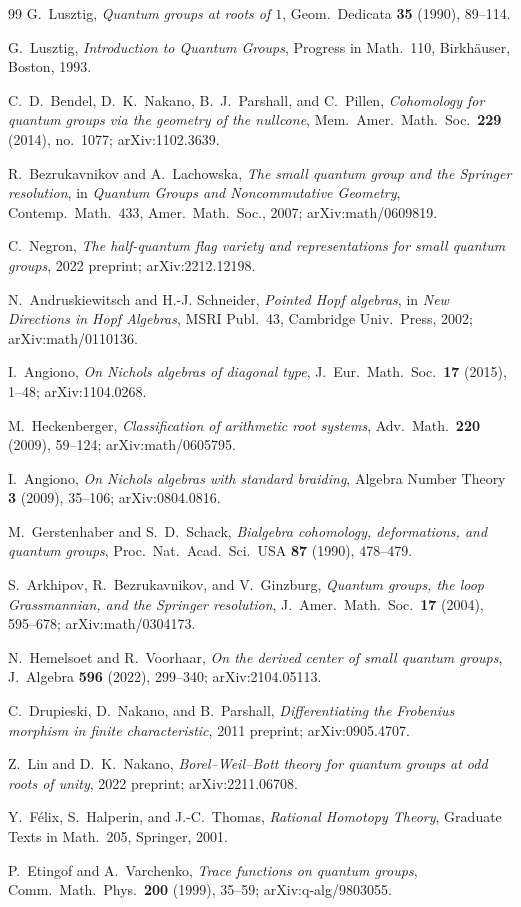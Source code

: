\documentclass[11pt,letterpaper]{amsart}
\theoremstyle{plain}
\theoremstyle{definition}
\theoremstyle{remark}
\begin{document}
\begin{thebibliography}{99}
G.~Lusztig, \emph{Quantum groups at roots of $1$}, Geom.\ Dedicata \textbf{35} (1990), 89--114.

G.~Lusztig, \emph{Introduction to Quantum Groups}, Progress in Math.\ 110, Birkh\"auser, Boston, 1993.

C.~D.~Bendel, D.~K.~Nakano, B.~J.~Parshall, and C.~Pillen, \emph{Cohomology for quantum groups via the geometry of the nullcone}, Mem.\ Amer.\ Math.\ Soc.\ \textbf{229} (2014), no.\ 1077; arXiv:1102.3639.

R.~Bezrukavnikov and A.~Lachowska, \emph{The small quantum group and the Springer resolution}, in \emph{Quantum Groups and Noncommutative Geometry}, Contemp.\ Math.\ 433, Amer.\ Math.\ Soc., 2007; arXiv:math/0609819.

C.~Negron, \emph{The half-quantum flag variety and representations for small quantum groups}, 2022 preprint; arXiv:2212.12198.

N.~Andruskiewitsch and H.-J. Schneider, \emph{Pointed Hopf algebras}, in \emph{New Directions in Hopf Algebras}, MSRI Publ.\ 43, Cambridge Univ.\ Press, 2002; arXiv:math/0110136.

I.~Angiono, \emph{On Nichols algebras of diagonal type}, J.\ Eur.\ Math.\ Soc.\ \textbf{17} (2015), 1--48; arXiv:1104.0268.

M.~Heckenberger, \emph{Classification of arithmetic root systems}, Adv.\ Math.\ \textbf{220} (2009), 59--124; arXiv:math/0605795.

I.~Angiono, \emph{On Nichols algebras with standard braiding}, Algebra Number Theory \textbf{3} (2009), 35--106; arXiv:0804.0816.

M.~Gerstenhaber and S.~D.~Schack, \emph{Bialgebra cohomology, deformations, and quantum groups}, Proc.\ Nat.\ Acad.\ Sci.\ USA \textbf{87} (1990), 478--479.

S.~Arkhipov, R.~Bezrukavnikov, and V.~Ginzburg, \emph{Quantum groups, the loop Grassmannian, and the Springer resolution}, J.\ Amer.\ Math.\ Soc.\ \textbf{17} (2004), 595--678; arXiv:math/0304173.

N.~Hemelsoet and R.~Voorhaar, \emph{On the derived center of small quantum groups}, J.\ Algebra \textbf{596} (2022), 299--340; arXiv:2104.05113.

C.~Drupieski, D.~Nakano, and B.~Parshall, \emph{Differentiating the Frobenius morphism in finite characteristic}, 2011 preprint; arXiv:0905.4707.

Z.~Lin and D.~K.~Nakano, \emph{Borel--Weil--Bott theory for quantum groups at odd roots of unity}, 2022 preprint; arXiv:2211.06708.

Y.~F\'elix, S.~Halperin, and J.-C.~Thomas, \emph{Rational Homotopy Theory}, Graduate Texts in Math.\ 205, Springer, 2001.

P.~Etingof and A.~Varchenko, \emph{Trace functions on quantum groups}, Comm.\ Math.\ Phys.\ \textbf{200} (1999), 35--59; arXiv:q-alg/9803055.

\end{thebibliography}
\end{document}
